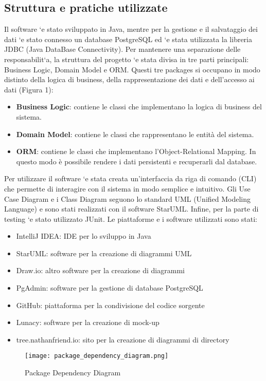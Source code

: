 \documentclass{article}
\begin{document}
\subsection{Struttura e pratiche utilizzate}
Il software `e stato sviluppato in Java, mentre per la gestione e il salvataggio dei dati `e stato
connesso un database PostgreSQL ed `e stata utilizzata la libreria JDBC (Java DataBase
Connectivity).
\vspace{2mm}
\newline
Per mantenere una separazione delle responsabilit`a, la struttura del progetto `e stata divisa
in tre parti principali: Business Logic, Domain Model e ORM. Questi tre packages si occupano in modo distinto della logica di business, della rappresentazione dei dati e dell’accesso
ai dati (Figura 1):
\begin{itemize}
    \item \textbf{Business Logic}: contiene le classi che implementano la logica di business del sistema.
    \item \textbf{Domain Model}: contiene le classi che rappresentano le entità del sistema.
    \item \textbf{ORM}: contiene le classi che implementano l’Object-Relational Mapping. In questo modo è possibile rendere i dati persistenti e recuperarli dal database.
\end{itemize}
\vspace{2mm}
Per utilizzare il software `e stata creata un’interfaccia da riga di comando (CLI) che permette di interagire con il sistema in modo semplice e intuitivo.
\vspace{0mm}
\newline
Gli Use Case Diagram e i Class Diagram seguono lo standard UML (Unified Modeling
Language) e sono stati realizzati con il software StarUML. Infine, per la parte di testing `e
stato utilizzato JUnit.
Le piattaforme e i software utilizzati sono stati:

\begin{itemize}
    \item IntelliJ IDEA: IDE per lo sviluppo in Java
    \item StarUML: software per la creazione di diagrammi UML
    \item Draw.io: altro software per la creazione di diagrammi
    \item PgAdmin: software per la gestione di database PostgreSQL
    \item GitHub: piattaforma per la condivisione del codice sorgente
    \item Lunacy: software per la creazione di mock-up
    \item tree.nathanfriend.io: sito per la creazione di diagrammi di directory
\end{itemize}
\begin{figure}[h!]
    \centering
    \texttt{[image: package\_dependency\_diagram.png]}
    \caption{Package Dependency Diagram}
    \label{fig:package_diagram}
\end{figure}
\newpage
\end{document}
